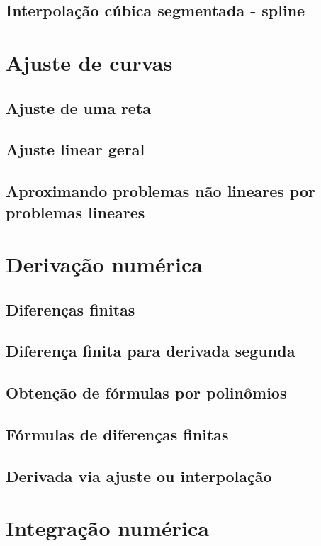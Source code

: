 \documentclass{article}
\theoremstyle{plain}
\theoremstyle{definition}
\theoremstyle{remark}
\begin{document}
\subsection{Interpolação cúbica segmentada - spline}

\section{Ajuste de curvas}

\subsection{Ajuste de uma reta}
\subsection{Ajuste linear geral}
\subsection{Aproximando problemas não lineares por problemas lineares}

\section{Derivação numérica}

\subsection{Diferenças finitas}
\subsection{Diferença finita para derivada segunda}
\subsection{Obtenção de fórmulas por polinômios}
\subsection{Fórmulas de diferenças finitas}
\subsection{Derivada via ajuste ou interpolação}

\section{Integração numérica}
\end{document}
